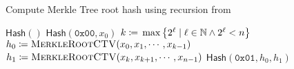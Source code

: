 \begin{algorithm}[t]
\caption{Compute Merkle Tree root hash using \gls{recursion}
    from~\cite{rfc9162}}
\label{alg:merkle_tree_ctv}
\begin{algorithmic}[1]
        \State \Return $\textsf{Hash}()$
        \State \Return $\textsf{Hash}(\texttt{0x00}, x_{0})$
    \Else
        \State $k \coloneqq{}
            \max\left\{ 2^{\ell} \mid \ell\in\mathbb{N} \land 2^{\ell} < n \right\}$
        \State $h_{0} \coloneqq{}
            \textsc{MerkleRootCTV}(x_{0}, x_{1}, \cdots, x_{k-1})$
        \State $h_{1} \coloneqq{}
            \textsc{MerkleRootCTV}(x_{k}, x_{k+1}, \cdots, x_{n-1})$
        \State \Return $\textsf{Hash}(\texttt{0x01}, h_{0}, h_{1})$
    \EndIf
\EndProcedure
\end{algorithmic}
\end{algorithm}
